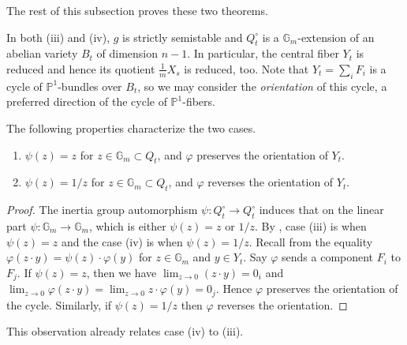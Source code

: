 \documentclass[reqno, letterpaper]{amsart}
\numberwithin{equation}{subsection}
\let\to\longrightarrow
\newcommand{\GG}{\mathbb{G}}
\newcommand{\PP}{\mathbb{P}}
\begin{document}
		The rest of this subsection proves these two theorems.
		
		\medskip
		
		In both (iii) and (iv), $g$ is strictly semistable and $Q^\circ_t$ is a $\GG_m$-extension of an abelian variety $B_t$ of dimension $n-1$. In particular, the central fiber $Y_t$ is reduced and hence its quotient $\frac{1}{m}X_s$ is reduced, too. Note that $Y_t = \sum_i F_i$ is a cycle of $\PP^1$-bundles over $B_t$, so we may consider the \emph{orientation} of this cycle, a preferred direction of the cycle of $\PP^1$-fibers.
		
		\begin{lemma} \label{lem:classification of multiple fiber iii:orientation}
			The following properties characterize the two cases.
			\begin{enumerate}
				\item[\textnormal{(iii)}] $\psi(z) = z$ for $z \in \GG_m \subset Q_t$, and $\varphi$ preserves the orientation of $Y_t$.
				\item[\textnormal{(iv)}] $\psi(z) = 1/z$ for $z \in \GG_m \subset Q_t$, and $\varphi$ reverses the orientation of $Y_t$.
			\end{enumerate}
		\end{lemma}
		\begin{proof}
			The inertia group automorphism $\psi : Q^\circ_t \to Q^\circ_t$ induces that on the linear part $\psi : \GG_m \to \GG_m$, which is either $\psi(z) = z$ or $1/z$. By , case (iii) is when $\psi(z) = z$ and the case (iv) is when $\psi(z) = 1/z$. Recall from  the equality $\varphi (z \cdot y) = \psi(z) \cdot \varphi(y)$ for $z \in \GG_m$ and $y \in Y_t$. Say $\varphi$ sends a component $F_i$ to $F_j$. If $\psi(z) = z$, then we have $\lim_{z \rightarrow 0} (z \cdot y) = 0_i$ and $\lim_{z \rightarrow 0} \varphi(z \cdot y) = \lim_{z \rightarrow 0} z \cdot \varphi(y) = 0_j$. Hence $\varphi$ preserves the orientation of the cycle. Similarly, if $\psi(z) = 1/z$ then $\varphi$ reverses the orientation.
		\end{proof}
		
		This observation already relates case (iv) to (iii).
		
\end{document}
